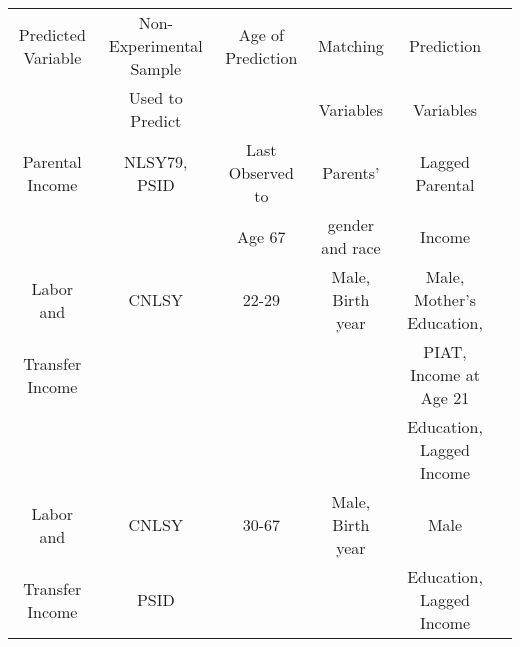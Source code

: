 \begin{tabular}{cccccc} \toprule
Predicted Variable	&	Non-Experimental Sample	&	Age of Prediction	&	Matching	&	Prediction	\\ 
                           	&	Used to Predict           	&		&	Variables	&	Variables	                          \\  \midrule
Parental Income	&	NLSY79, PSID	&	Last Observed to  	&	Parents'	&	     Lagged Parental     	          \\ 
                                  &                               &                                  Age 67              &      gender and race    &            Income          \\ \midrule
Labor and	&	CNLSY	&	22-29	&	Male, Birth year	 &	Male, Mother's Education,  \\
   Transfer Income             &                       &                      &                                 &      PIAT, Income at Age 21 \\ 
                &                      &                      &                                 &  Education,  Lagged Income                         \\ \midrule
Labor and	&	CNLSY	& 30-67	&	Male, Birth year	 &	Male  \\
   Transfer Income  &       PSID        &                      &                                 &  Education,  Lagged Income                         \\ \bottomrule
\end{tabular}